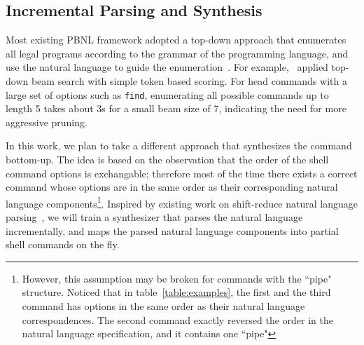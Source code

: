 \subsection{Incremental Parsing and Synthesis}

Most existing PBNL framework adopted a top-down approach that enumerates all legal programs according to the grammar of the programming language, and use the natural language to guide the enumeration~\cite{DBLP:journals/corr/DesaiGHJKMRR15,bashsynthesis}. For example,~\cite{bashsynthesis} applied top-down beam search with simple token based scoring. For head commands with a large set of options such as {\tt find}, enumerating all possible commands up to length 5 takes about 3s for a small beam size of 7, indicating the need for more aggressive pruning.

In this work, we plan to take a different approach that synthesizes the command bottom-up. The idea is based on the observation that the order of the shell command options is exchangable; therefore most of the time there exists a correct command whose options are in the same order as their corresponding natural language components\footnote{However, this assumption may be broken for commands with the ``pipe" structure. Noticed that in table~\ref{table:examples}, the first and the third command has options in the same order as their natural language correspondences. The second command exactly reversed the order in the natural language specification, and it contains one ``pipe"}. Inspired by existing work on shift-reduce natural language parsing~\cite{zhao2014type,dyer2015transition,huang2010dynamic}, we will train a synthesizer that parses the natural language incrementally, and maps the parsed natural language components into partial shell commands on the fly. %